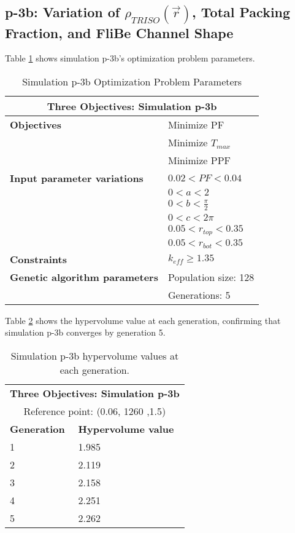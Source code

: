 \subsection{p-3b: Variation of $\rho_{TRISO}(\vec{r})$, Total Packing Fraction, and FliBe Channel Shape}
Table \ref{tab:simulationp3b} shows simulation p-3b's optimization problem parameters. 
\begin{table}[htbp!]
    \centering
    \onehalfspacing
    \caption{Simulation p-3b Optimization Problem Parameters}
	\label{tab:simulationp3b}
    \footnotesize
    \begin{tabular}{l|p{4cm}}
    \hline 
    \multicolumn{2}{c}{\textbf{Three Objectives: Simulation p-3b}} \\
    \hline 
    \textbf{Objectives} & Minimize PF \\
    & Minimize $T_{max}$ \\
    & Minimize PPF \\
    \hline 
    \textbf{Input parameter variations} & $0.02<PF<0.04$ \\
    & $0<a<2$ \\
    & $0<b<\frac{\pi}{2}$ \\
    & $0<c<2\pi$ \\
    & $0.05<r_{top}<0.35$ \\
    & $0.05<r_{bot}<0.35$ \\
    \hline
    \textbf{Constraints} & $k_{eff} \geq 1.35$\\ 
    \hline 
    \textbf{Genetic algorithm parameters} & Population size: 128 \\
    & Generations: 5 \\
    \hline
    \end{tabular}
\end{table}

Table \ref{tab:p3b-hypervolume} shows the hypervolume value at each generation, 
confirming that simulation p-3b converges by generation 5. 
\begin{table}[htbp!]
    \centering
    \onehalfspacing
    \caption{Simulation p-3b hypervolume values at each generation.}
	\label{tab:p3b-hypervolume}
    \footnotesize
    \begin{tabular}{ll}
    \hline 
    \multicolumn{2}{c}{\textbf{Three Objectives: Simulation p-3b}} \\
    \multicolumn{2}{c}{Reference point: (0.06, 1260 ,1.5)} \\
    \hline 
    \textbf{Generation} & \textbf{Hypervolume value} \\
    \hline
    1 & 1.985 \\
    2 & 2.119 \\
    3 & 2.158 \\
    4 & 2.251\\
    5 & 2.262 \\
    \hline
    \end{tabular}
\end{table}

